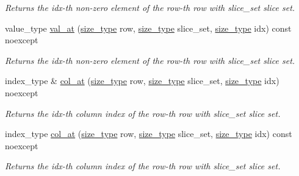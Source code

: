 \begin{DoxyCompactItemize}
\begin{DoxyCompactList}\small\item\em Returns the {\ttfamily idx}-\/th non-\/zero element of the {\ttfamily row}-\/th row with {\ttfamily slice\+\_\+set} slice set. \end{DoxyCompactList}\item 
value\+\_\+type \hyperlink{classgko_1_1matrix_1_1Sellp_ad4bb228252469da6e57eb38edd66fb8e}{val\+\_\+at} (\hyperlink{namespacegko_a6e5c95df0ae4e47aab2f604a22d98ee7}{size\+\_\+type} row, \hyperlink{namespacegko_a6e5c95df0ae4e47aab2f604a22d98ee7}{size\+\_\+type} slice\+\_\+set, \hyperlink{namespacegko_a6e5c95df0ae4e47aab2f604a22d98ee7}{size\+\_\+type} idx) const noexcept
\begin{DoxyCompactList}\small\item\em Returns the {\ttfamily idx}-\/th non-\/zero element of the {\ttfamily row}-\/th row with {\ttfamily slice\+\_\+set} slice set. \end{DoxyCompactList}\item 
index\+\_\+type \& \hyperlink{classgko_1_1matrix_1_1Sellp_a994af14832dbc9ff70e431f6c11a1d52}{col\+\_\+at} (\hyperlink{namespacegko_a6e5c95df0ae4e47aab2f604a22d98ee7}{size\+\_\+type} row, \hyperlink{namespacegko_a6e5c95df0ae4e47aab2f604a22d98ee7}{size\+\_\+type} slice\+\_\+set, \hyperlink{namespacegko_a6e5c95df0ae4e47aab2f604a22d98ee7}{size\+\_\+type} idx) noexcept
\begin{DoxyCompactList}\small\item\em Returns the {\ttfamily idx}-\/th column index of the {\ttfamily row}-\/th row with {\ttfamily slice\+\_\+set} slice set. \end{DoxyCompactList}\item 
index\+\_\+type \hyperlink{classgko_1_1matrix_1_1Sellp_a5fb397d1dc15063dc4dc78bb9d9b4f72}{col\+\_\+at} (\hyperlink{namespacegko_a6e5c95df0ae4e47aab2f604a22d98ee7}{size\+\_\+type} row, \hyperlink{namespacegko_a6e5c95df0ae4e47aab2f604a22d98ee7}{size\+\_\+type} slice\+\_\+set, \hyperlink{namespacegko_a6e5c95df0ae4e47aab2f604a22d98ee7}{size\+\_\+type} idx) const noexcept
\begin{DoxyCompactList}\small\item\em Returns the {\ttfamily idx}-\/th column index of the {\ttfamily row}-\/th row with {\ttfamily slice\+\_\+set} slice set. \end{DoxyCompactList}\end{DoxyCompactItemize}
